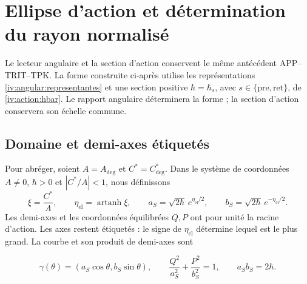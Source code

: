 \section{Ellipse d’action et détermination du rayon normalisé}
\label{iv:ellipse:section}

Le lecteur angulaire et la section d’action conservent le même
antécédent APP--TRIT--TPK. La forme construite
ci-après utilise les représentations
\eqref{iv:angular:representantes} et une section positive
\(\hbar=\hbar_s\), avec
\(s\in\{\mathrm{pre},\mathrm{ret}\}\), de
\eqref{iv:action:hbar}. Le rapport angulaire déterminera la forme ;
la section d’action conservera son échelle commune.

\subsection{Domaine et demi-axes étiquetés
}
\label{iv:ellipse:dominio}

Pour abréger, soient \(A=A_{\deg}\) et \(C^*=C^*_{\deg}\).
Dans le système de coordonnées \(A\ne0\), \(\hbar>0\) et \(|C^*/A|<1\),
nous définissons
\begin{equation}
 \xi=\frac{C^*}{A},\qquad
 \eta_{\mathrm{el}}=\operatorname{artanh}\xi,\qquad
 a_S=\sqrt{2\hbar}\,e^{\eta_{\mathrm{el}}/2},\qquad
 b_S=\sqrt{2\hbar}\,e^{-\eta_{\mathrm{el}}/2}.
 \label{iv:ellipse:semiejes}
\end{equation}
Les demi-axes et les coordonnées équilibrées \(Q,P\) ont pour
unité la racine d’action. Les axes restent étiquetés :
le signe de \(\eta_{\mathrm{el}}\) détermine lequel est le
plus grand. La courbe et son produit de demi-axes sont

\begin{equation}
 \gamma(\theta)=(a_S\cos\theta,b_S\sin\theta),\qquad
 \frac{Q^2}{a_S^2}+\frac{P^2}{b_S^2}=1,\qquad
 a_Sb_S=2\hbar.
 \label{iv:ellipse:curva}
\end{equation}

